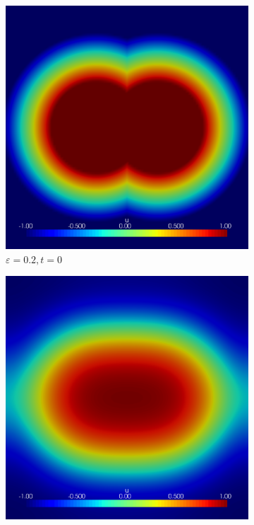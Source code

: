 \begin{figure}[h]
	\centering
	
	\begin{subfigure}[b]{0.3\linewidth}
		\includegraphics[width=\linewidth]{numerical_simulation/dumbel/eps_0.2000000.vtu}
		\caption{$ \varepsilon = 0.2, t = 0 $}
	\end{subfigure}
	\hfill
	\begin{subfigure}[b]{0.3\linewidth}
		\includegraphics[width=\linewidth]{numerical_simulation/dumbel/eps_0.2000015.vtu}

\end{subfigure}
\end{figure}
